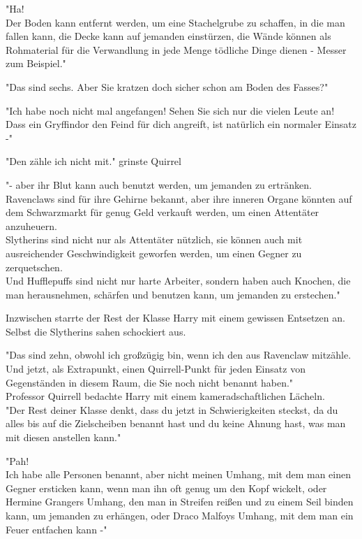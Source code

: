 {"Ha!\\ Der Boden kann entfernt werden, um eine Stachelgrube zu schaffen, in die man fallen kann, die Decke kann auf jemanden einstürzen, die Wände können als Rohmaterial für die Verwandlung in jede Menge tödliche Dinge dienen - Messer zum Beispiel."

"Das sind sechs. Aber Sie kratzen doch sicher schon am Boden des Fasses?"

"Ich habe noch nicht mal angefangen! Sehen Sie sich nur die vielen Leute an!\\ Dass ein Gryffindor den Feind für dich angreift, ist natürlich ein normaler Einsatz -"

"Den zähle ich nicht mit." grinste Quirrel

"- aber ihr Blut kann auch benutzt werden, um jemanden zu ertränken.\\ Ravenclaws sind für ihre Gehirne bekannt, aber ihre inneren Organe könnten auf dem Schwarzmarkt für genug Geld verkauft werden, um einen Attentäter anzuheuern.\\ Slytherins sind nicht nur als Attentäter nützlich, sie können auch mit ausreichender Geschwindigkeit geworfen werden, um einen Gegner zu zerquetschen.\\ Und Hufflepuffs sind nicht nur harte Arbeiter, sondern haben auch Knochen, die man herausnehmen, schärfen und benutzen kann, um jemanden zu erstechen."

Inzwischen starrte der Rest der Klasse Harry mit einem gewissen Entsetzen an.\\ Selbst die Slytherins sahen schockiert aus.

"Das sind zehn, obwohl ich großzügig bin, wenn ich den aus Ravenclaw mitzähle.\\ Und jetzt, als Extrapunkt, einen Quirrell-Punkt für jeden Einsatz von Gegenständen in diesem Raum, die Sie noch nicht benannt haben."\\ Professor Quirrell bedachte Harry mit einem kameradschaftlichen Lächeln.\\ "Der Rest deiner Klasse denkt, dass du jetzt in Schwierigkeiten steckst, da du alles bis auf die Zielscheiben benannt hast und du keine Ahnung hast, was man mit diesen anstellen kann."

"Pah!\\ Ich habe alle Personen benannt, aber nicht meinen Umhang, mit dem man einen Gegner ersticken kann, wenn man ihn oft genug um den Kopf wickelt, oder Hermine Grangers Umhang, den man in Streifen reißen und zu einem Seil binden kann, um jemanden zu erhängen, oder Draco Malfoys Umhang, mit dem man ein Feuer entfachen kann -"

}
